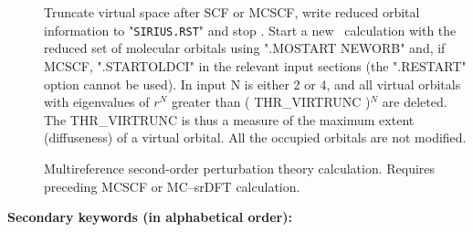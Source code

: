 \begin{description}
\begin{description}
\item[] \ \\
   \\
  Truncate virtual space after SCF or MCSCF, write reduced orbital information to 
  "\verb|SIRIUS.RST|" and stop \dalton. Start a new \dalton\ calculation with the
  reduced set of molecular orbitals using ".MOSTART NEWORB" and, if MCSCF, ".STARTOLDCI"
  in the relevant input sections (the ".RESTART" option cannot be used).
  In input N is either 2 or 4, and all virtual orbitals with eigenvalues of
  $r^N$ greater than ( THR\_VIRTRUNC )$^N$ are deleted.
  The THR\_VIRTRUNC is thus a measure of the maximum extent (diffuseness) of a virtual orbital.
  All the occupied orbitals are not modified.

\item[]
  Multireference second-order perturbation theory calculation.
  Requires preceding MCSCF or MC--srDFT calculation.

\end{description}

\end{description}

{\bf Secondary keywords (in alphabetical order): }

